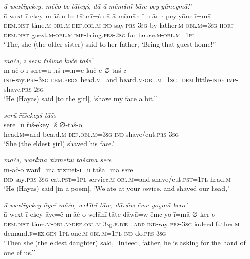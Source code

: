 \ea \label{ŽH.50}
\textit{ā wextīyekey, māčo be tāteyš, dā ā mēmānī bāre pey yāneymā!’} \\ 
\gll ā wext-ī-ekey m-āč-o be tāte-ī=š dā ā mēmān-ī b-ār-e pey yāne-ī=mā \\ 
 \textsc{dem.dist} time\textsc{.m}\textsc{-obl}\textsc{.m}\textsc{-def}\textsc{.obl}\textsc{.m} \textsc{ind-}say\textsc{.prs}\textsc{-3sg} by father\textsc{.m}\textsc{-obl}\textsc{.m}\textsc{=3sg} \textsc{hort} \textsc{dem.dist} guest\textsc{.m}\textsc{-obl}\textsc{.m} \textsc{imp-}bring\textsc{.prs}-\textsc{2sg} for house\textsc{.m}\textsc{-obl}\textsc{.m}\textsc{=1pl} \\ 
\glt `The, she (the older sister) said to her father, ‘Bring that guest home!’'
\z 
 
\ea \label{ŽH.53}
\textit{māčo, ī serū řīšīme kučē tāše’} \\ 
\gll m-āč-o ī sere=ū řīš-ī=m=e kuč-ē ∅-tāš-e \\ 
 \textsc{ind-}say\textsc{.prs}\textsc{-3sg} \textsc{dem.prox} head\textsc{.m}=and beard\textsc{.m}\textsc{-obl}\textsc{.m}\textsc{=1sg}\textsc{=dem} little\textsc{-indf} \textsc{imp-}shave\textsc{.prs}-\textsc{2sg} \\ 
\glt `He (Hayas) said [to the girl], ‘shave my face a bit.’'
\z 
 
\ea \label{ŽH.54}
\textit{serū řīšekeyš tāšo} \\ 
\gll sere=ū řīš-ekey=š ∅-tāš-o \\ 
 head\textsc{.m}=and beard\textsc{.m}\textsc{-def}\textsc{.obl}\textsc{.m}\textsc{=3sg} \textsc{ind-}shave/cut\textsc{.prs}\textsc{-3sg} \\ 
\glt `She (the eldest girl) shaved his face.'
\z 
 
\ea \label{ŽH.55}
\textit{māčo, wārđmā xizmetīū tāšāmā sere} \\ 
\gll m-āč-o wārđ=mā xizmet-ī=ū tāšā=mā sere \\ 
 \textsc{ind-}say\textsc{.prs}\textsc{-3sg} eat\textsc{.pst}\textsc{=1pl} service\textsc{.m}\textsc{-obl}\textsc{.m}=and shave/cut\textsc{.pst}\textsc{=1pl} head\textsc{.m} \\ 
\glt `He (Hayas) said [in a poem], ‘We ate at your sevice, and shaved our head,'
\z 
 
\ea \label{ŽH.57}
\textit{ā wextīyekey āyeč māčo, weɫāhī tāte, dāwāw ēme yoymā kero’} \\ 
\gll ā wext-ī-ekey āye=č m-āč-o weɫāhī tāte dāwā=w ēme yo-ī=mā ∅-ker-o \\ 
 \textsc{dem.dist} time\textsc{.m}\textsc{-obl}\textsc{.m}\textsc{-def}\textsc{.obl}\textsc{.m} 3sg\textsc{\textsc{.f}}\textsc{.dir}\textsc{=add} \textsc{ind-}say\textsc{.prs}\textsc{-3sg} indeed father\textsc{.m} demand\textsc{\textsc{.f}}\textsc{=ez}\textsc{.gen} \textsc{1pl} one\textsc{.m}\textsc{-obl}\textsc{.m}\textsc{=1pl} \textsc{ind-}do\textsc{.prs}\textsc{-3sg} \\ 
\glt `Then she (the eldest daughter) said, ‘Indeed, father, he is asking for the hand of one of us.’'
\z 
 
